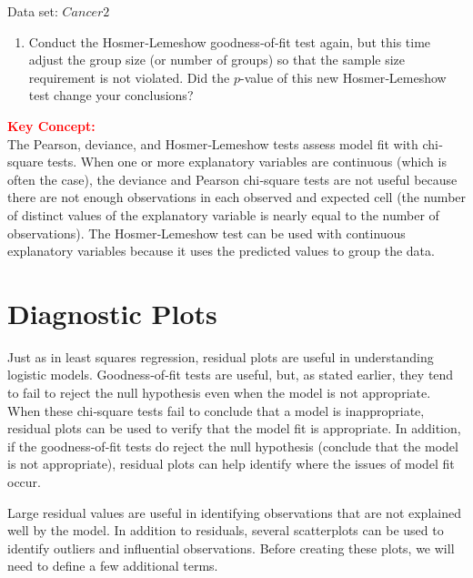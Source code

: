 \documentclass[
]{report}
\providecommand{\tightlist}{%
  \setlength{\itemsep}{0pt}\setlength{\parskip}{0pt}}
\begin{document}
Data set: \(Cancer2\)

\begin{enumerate}
\def\labelenumi{\arabic{enumi}.}
\setcounter{enumi}{31}
\tightlist
\item
  Conduct the Hosmer‐Lemeshow goodness‐of‐fit test again, but this time adjust the group size (or number of groups) so that the sample size requirement is not violated. Did the \(p\)-value of this new Hosmer‐Lemeshow test change your conclusions?
\end{enumerate}

\large

\textbf{\textcolor{red}{Key Concept:}}\\
\color{red}
The Pearson, deviance, and Hosmer‐Lemeshow tests assess model fit with chi‐square tests. When one or more explanatory variables are continuous (which is often the case), the deviance and Pearson chi‐square tests are not useful because there are not enough observations in each observed and expected cell (the number of distinct values of the explanatory variable is nearly equal to the number of observations). The Hosmer‐Lemeshow test can be used with continuous explanatory variables because it uses the predicted values to group the data.
\color{black}
\normalsize

\hypertarget{diagnostic-plots}{%
\section{\texorpdfstring{\textbf{Diagnostic Plots}}{Diagnostic Plots}}\label{diagnostic-plots}}

Just as in least squares regression, residual plots are useful in understanding logistic models. Goodness‐of‐fit tests are useful, but, as stated earlier, they tend to fail to reject the null hypothesis even when the model is not appropriate. When these chi‐square tests fail to conclude that a model is inappropriate, residual plots can be used to verify that the model fit is appropriate. In addition, if the goodness‐of‐fit tests do reject the null hypothesis (conclude that the model is not appropriate), residual plots can help identify where the issues of model fit occur.

Large residual values are useful in identifying observations that are not explained well by the model. In addition to residuals, several scatterplots can be used to identify outliers and influential observations. Before creating these plots, we will need to define a few additional terms.
\end{document}
